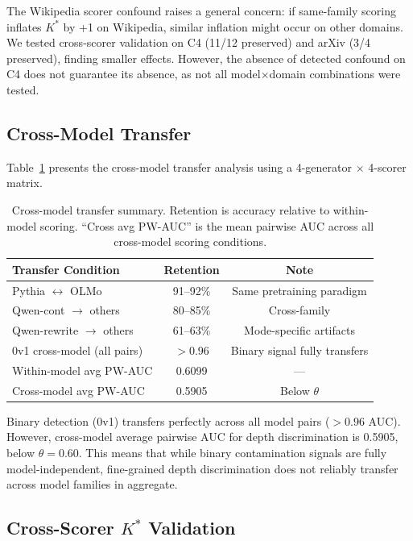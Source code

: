 \documentclass[11pt]{article}
\newcommand{\kstar}{K^*}
\newcommand{\thetaval}{\theta}
\begin{document}
The Wikipedia scorer confound raises a general concern: if same-family scoring inflates $\kstar$ by +1 on Wikipedia, similar inflation might occur on other domains. We tested cross-scorer validation on C4 (11/12 preserved) and arXiv (3/4 preserved), finding smaller effects. However, the absence of detected confound on C4 does not guarantee its absence, as not all model$\times$domain combinations were tested.


\subsection{Cross-Model Transfer}
\label{sec:transfer}

Table~\ref{tab:transfer} presents the cross-model transfer analysis using a 4-generator $\times$ 4-scorer matrix.

\begin{table}[t]
\centering
\caption{Cross-model transfer summary. Retention is accuracy relative to within-model scoring. ``Cross avg PW-AUC'' is the mean pairwise AUC across all cross-model scoring conditions.}
\label{tab:transfer}
\small
\begin{tabular}{lcc}
\toprule
Transfer Condition & Retention & Note \\
\midrule
Pythia $\leftrightarrow$ OLMo & 91--92\% & Same pretraining paradigm \\
Qwen-cont $\to$ others & 80--85\% & Cross-family \\
Qwen-rewrite $\to$ others & 61--63\% & Mode-specific artifacts \\
\midrule
0v1 cross-model (all pairs) & $>0.96$ & Binary signal fully transfers \\
Within-model avg PW-AUC & 0.6099 & --- \\
Cross-model avg PW-AUC & 0.5905 & Below $\thetaval$ \\
\bottomrule
\end{tabular}
\end{table}

Binary detection (0v1) transfers perfectly across all model pairs ($>0.96$ AUC). However, cross-model average pairwise AUC for depth discrimination is 0.5905, below $\thetaval = 0.60$. This means that while binary contamination signals are fully model-independent, fine-grained depth discrimination does not reliably transfer across model families in aggregate.

\subsection{Cross-Scorer $\kstar$ Validation}
\label{sec:cross-scorer}
\end{document}
